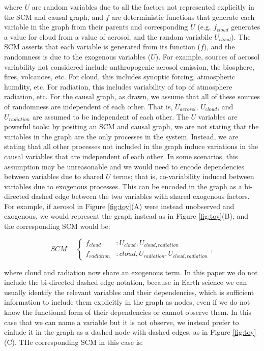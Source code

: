 \documentclass[12pt]{article}
\begin{document}
where $U$ are random variables due to all the factors not represented
explicitly in the SCM and causal graph, and $f$ are deterministic
functions that generate each variable in the graph from their parents
and corresponding $U$ (e.g. $f_{cloud}$ generates a value for cloud
from a value of aerosol, and the random variabile $U_{cloud}$). The
SCM asserts that each variable is generated from its function ($f$),
and the randomness is due to the exogenous variables ($U$). For
example, sources of aerosol variability not considered include
anthropogenic aerosol emission, the biosphere, fires, volcanoes,
etc. For cloud, this includes synoptic forcing, atmospheric humdity,
etc. For radiation, this includes variability of top of atmosphere
radiation, etc. For the causal graph, as drawn, we assume that all of
these sources of randomness are independent of each other. That is,
$U_{aerosol}$, $U_{cloud}$, and $U_{radiation}$ are assumed to be
independent of each other. The $U$ variables are powerful tools: by
positing an SCM and causal graph, we are not stating that the
variables in the graph are the only processes in the system. Instead,
we are stating that all other processes not included in the graph
induce variations in the causal variables that are independent of each
other. In some scenarios, this assumption may be unreasonable and we
would need to encode dependencies between variables due to shared $U$
terms; that is, co-variability induced between variables due to
exogenous processes. This can be encoded in the graph as a bi-directed
dashed edge between the two variables with shared exogenous
factors. For example, if aerosol in Figure \ref{fig:toy}(A) were
instead unobserved and exogenous, we would represent the graph instead
as in Figure \ref{fig:toy}(B), and the corresponding SCM would be:

\begin{equation}
  SCM =
  \begin{cases}
    f_{cloud} &: U_{cloud}, U_{cloud,radiation}  \\
    f_{radiation} &: cloud, U_{radiation}, U_{cloud,radiation}
  \end{cases},
  \label{eq:2}
\end{equation}

where cloud and radiation now share an exogenous term. In this paper
we do not include the bi-directed dashed edge notation, because in
Earth science we can usually identify the relevant variables and their
dependencies, which is sufficient information to include them
explicitly in the graph as nodes, even if we do not know the
functional form of their dependencies or cannot observe them. In this
case that we can name a variable but it is not observe, we instead
prefer to cinlude it in the graph as a dashed node with dashed edges,
as in Figure \ref{fig:toy}(C). THe corresponding SCM in this case is:
\end{document}
